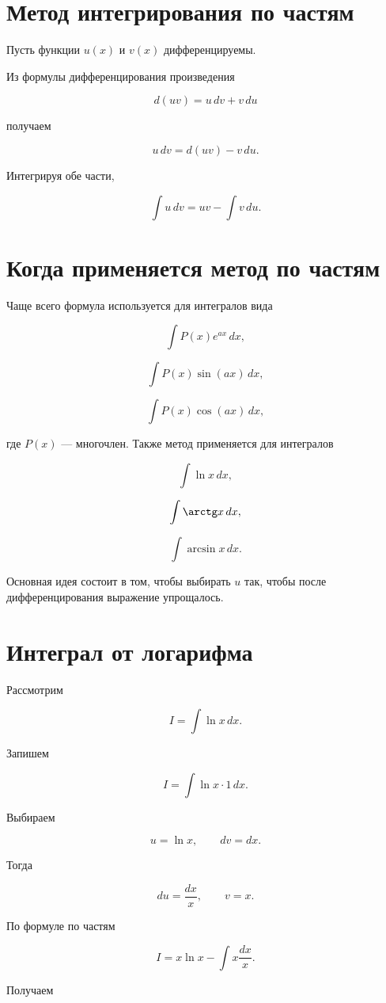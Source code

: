 \documentclass[14pt]{extreport}
\begin{document}
\section{Метод интегрирования по частям}

Пусть функции $u(x)$ и $v(x)$ дифференцируемы.

Из формулы дифференцирования произведения

\[
d(uv)=u\,dv+v\,du
\]

получаем

\[
u\,dv=d(uv)-v\,du.
\]

Интегрируя обе части,

\[
\int u\,dv
=
uv-\int v\,du.
\]

\section{Когда применяется метод по частям}

Чаще всего формула используется для интегралов вида

\[
\int P(x)e^{ax}\,dx,
\]

\[
\int P(x)\sin(ax)\,dx,
\]

\[
\int P(x)\cos(ax)\,dx,
\]

где $P(x)$ --- многочлен.
\newpage
Также метод применяется для интегралов

\[
\int \ln x\,dx,
\]

\[
\int \arctg x\,dx,
\]

\[
\int \arcsin x\,dx.
\]

Основная идея состоит в том, чтобы выбирать $u$
так, чтобы после дифференцирования выражение упрощалось.

\section{Интеграл от логарифма}

Рассмотрим

\[
I=\int\ln x\,dx.
\]

Запишем

\[
I=\int\ln x\cdot1\,dx.
\]

Выбираем

\[
u=\ln x,
\qquad
dv=dx.
\]

Тогда

\[
du=\frac{dx}{x},
\qquad
v=x.
\]

По формуле по частям

\[
I
=
x\ln x
-
\int x\frac{dx}{x}.
\]

Получаем
\end{document}
